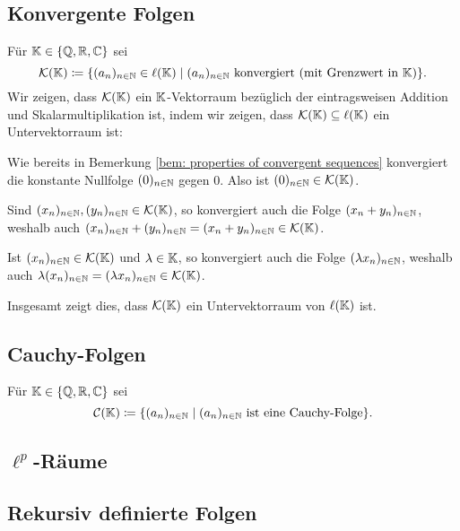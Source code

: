 \subsection{Konvergente Folgen}
Für $\mathbb{K} \in \{\mathbb{Q}, \mathbb{R}, \mathbb{C}\}$  sei
\[
 \mathcal{K}(\mathbb{K})
 \coloneqq
 \{(a_n)_{n \in \mathbb{N}} \in \ell(\mathbb{K}) \mid \text{$(a_n)_{n \in \mathbb{N}}$ konvergiert (mit Grenzwert in $\mathbb{K}$)}\}.
\]
Wir zeigen, dass $\mathcal{K}(\mathbb{K})$ ein $\mathbb{K}$-Vektorraum bezüglich der eintragsweisen Addition und Skalarmultiplikation ist, indem wir zeigen, dass $\mathcal{K}(\mathbb{K}) \subseteq \ell(\mathbb{K})$ ein Untervektorraum ist:

Wie bereits in Bemerkung \ref{bem: properties of convergent sequences} konvergiert die konstante Nullfolge $(0)_{n \in \mathbb{N}}$ gegen $0$. Also ist $(0)_{n \in \mathbb{N}} \in \mathcal{K}(\mathbb{K})$.

Sind $(x_n)_{n \in \mathbb{N}}, (y_n)_{n \in \mathbb{N}} \in \mathcal{K}(\mathbb{K})$, so konvergiert auch die Folge $(x_n + y_n)_{n \in \mathbb{N}}$, weshalb auch $(x_n)_{n \in \mathbb{N}} + (y_n)_{n \in \mathbb{N}} = (x_n + y_n)_{n \in \mathbb{N}} \in \mathcal{K}(\mathbb{K})$.

Ist $(x_n)_{n \in \mathbb{N}} \in \mathcal{K}(\mathbb{K})$ und $\lambda \in \mathbb{K}$, so konvergiert auch die Folge $(\lambda x_n)_{n \in \mathbb{N}}$, weshalb auch $\lambda (x_n)_{n \in \mathbb{N}} = (\lambda x_n)_{n \in \mathbb{N}} \in \mathcal{K}(\mathbb{K})$.

Insgesamt zeigt dies, dass $\mathcal{K}(\mathbb{K})$ ein Untervektorraum von $\ell(\mathbb{K})$ ist.


\subsection{Cauchy-Folgen}
Für $\mathbb{K} \in \{\mathbb{Q}, \mathbb{R}, \mathbb{C}\}$ sei
\[
 \mathcal{C}(\mathbb{K})
 \coloneqq
 \{(a_n)_{n \in \mathbb{N}} \mid \text{$(a_n)_{n \in \mathbb{N}}$ ist eine Cauchy-Folge}\}.
\]


\subsection{\texorpdfstring{$\ell^p$}{lp}-Räume}


\subsection{}


\subsection{Rekursiv definierte Folgen}





